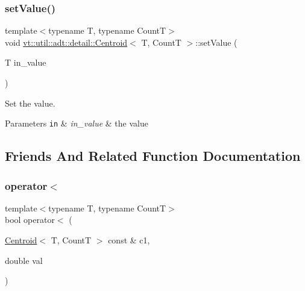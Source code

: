 \subsubsection{\texorpdfstring{set\+Value()}{setValue()}}
{\footnotesize\ttfamily template$<$typename T, typename CountT$>$ \\
void \hyperlink{structvt_1_1util_1_1adt_1_1detail_1_1_centroid}{vt\+::util\+::adt\+::detail\+::\+Centroid}$<$ T, CountT $>$\+::set\+Value (\begin{DoxyParamCaption}\item[{T}]{in\+\_\+value }\end{DoxyParamCaption})\hspace{0.3cm}{\ttfamily [inline]}}



Set the value. 


\begin{DoxyParams}[1]{Parameters}
\mbox{\tt in}  & {\em in\+\_\+value} & the value \\
\hline
\end{DoxyParams}


\subsection{Friends And Related Function Documentation}
\mbox{\label{structvt_1_1util_1_1adt_1_1detail_1_1_centroid_a6d689befe39b63c2d22558863e56084f}} 
\subsubsection{\texorpdfstring{operator$<$}{operator<}}
{\footnotesize\ttfamily template$<$typename T, typename CountT$>$ \\
bool operator$<$ (\begin{DoxyParamCaption}\item[{\hyperlink{structvt_1_1util_1_1adt_1_1detail_1_1_centroid}{Centroid}$<$ T, CountT $>$ const \&}]{c1,  }\item[{double}]{val }\end{DoxyParamCaption})\hspace{0.3cm}{\ttfamily [friend]}}



